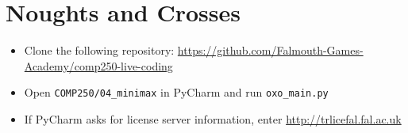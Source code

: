 \part{Noughts and Crosses}
\frame{\partpage}

\begin{frame}
	\begin{itemize}
		\item Clone the following repository:
			\url{https://github.com/Falmouth-Games-Academy/comp250-live-coding}
		\item Open \texttt{COMP250/04\_minimax} in PyCharm and run \texttt{oxo\_main.py}
		\item If PyCharm asks for license server information, enter \url{http://trlicefal.fal.ac.uk}
	\end{itemize}
\end{frame}
